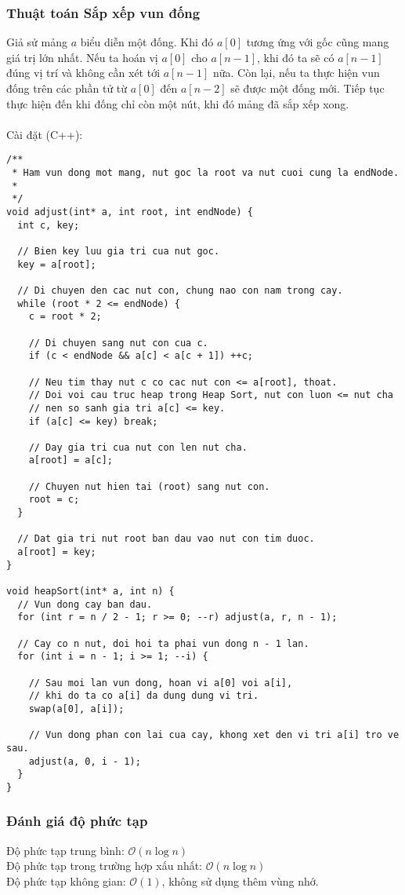 \documentclass[]{article}
\begin{document}
\subsubsection{Thuật toán Sắp xếp vun đống}
Giả sử mảng $a$ biểu diễn một đống. Khi đó $a[0]$ tương ứng với gốc cũng mang giá trị lớn nhất. Nếu ta hoán vị $a[0]$ cho $a[n - 1]$, khi đó ta sẽ có $a[n - 1]$ đúng vị trí và không cần xét tới $a[n - 1]$ nữa. Còn lại, nếu ta thực hiện vun đống trên các phần tử từ $a[0]$ đến $a[n - 2]$ sẽ được một đống mới. Tiếp tục thực hiện đến khi đống chỉ còn một nút, khi đó mảng đã sắp xếp xong.
\\\\
Cài đặt (C++):
\begin{lstlisting}
/**
 * Ham vun dong mot mang, nut goc la root va nut cuoi cung la endNode.
 *
 */
void adjust(int* a, int root, int endNode) {
  int c, key;

  // Bien key luu gia tri cua nut goc.
  key = a[root];

  // Di chuyen den cac nut con, chung nao con nam trong cay.
  while (root * 2 <= endNode) {
    c = root * 2;

    // Di chuyen sang nut con cua c.
    if (c < endNode && a[c] < a[c + 1]) ++c;

    // Neu tim thay nut c co cac nut con <= a[root], thoat.
    // Doi voi cau truc heap trong Heap Sort, nut con luon <= nut cha
    // nen so sanh gia tri a[c] <= key.
    if (a[c] <= key) break;

    // Day gia tri cua nut con len nut cha.
    a[root] = a[c];

    // Chuyen nut hien tai (root) sang nut con.
    root = c;
  }

  // Dat gia tri nut root ban dau vao nut con tim duoc.
  a[root] = key;
}

void heapSort(int* a, int n) {
  // Vun dong cay ban dau.
  for (int r = n / 2 - 1; r >= 0; --r) adjust(a, r, n - 1);

  // Cay co n nut, doi hoi ta phai vun dong n - 1 lan.
  for (int i = n - 1; i >= 1; --i) {

    // Sau moi lan vun dong, hoan vi a[0] voi a[i],
    // khi do ta co a[i] da dung dung vi tri.
    swap(a[0], a[i]);

    // Vun dong phan con lai cua cay, khong xet den vi tri a[i] tro ve sau.
    adjust(a, 0, i - 1);
  }
}
\end{lstlisting}
\subsubsection{Đánh giá độ phức tạp}
Độ phức tạp trung bình: $\mathcal{O}(n \log n)$
\\
Độ phức tạp trong trường hợp xấu nhất: $\mathcal{O}(n \log n)$
\\
Độ phức tạp không gian: $\mathcal{O}(1)$, không sử dụng thêm vùng nhớ.
\end{document}
